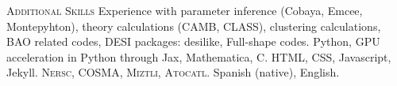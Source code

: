 \begin{rubric}{\faTools \textsc{Additional Skills}}
	Experience with parameter inference (Cobaya, Emcee, Montepyhton), theory calculations (CAMB, CLASS), clustering calculations, BAO related codes, DESI packages: desilike, Full-shape codes.
\entry*[Programming]
	Python, GPU acceleration in Python through Jax, Mathematica, C.
	HTML, CSS, Javascript, Jekyll.
\entry*[Supercomputer]
	\textsc{Nersc, COSMA, Miztli, Atocatl.}
\entry*[Languages]
	Spanish (native), English.
\end{rubric}